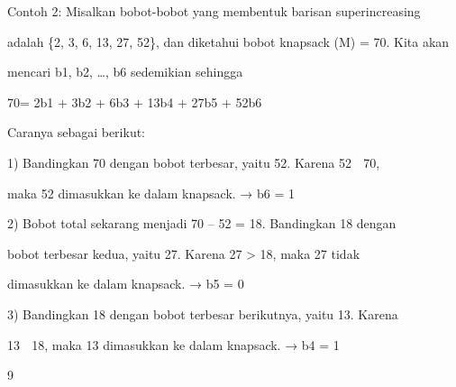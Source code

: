 \documentclass{article}
\begin{document}

Contoh 2: Misalkan bobot-bobot yang membentuk barisan superincreasing 

adalah \{2, 3, 6, 13, 27, 52\}, dan diketahui bobot knapsack (M) = 70. Kita akan 

mencari b1, b2, …, b6 sedemikian sehingga


70= 2b1 + 3b2 + 6b3 + 13b4 + 27b5 + 52b6

 Caranya sebagai berikut:

1) Bandingkan 70 dengan bobot terbesar, yaitu 52. Karena 52  70, 

maka 52 dimasukkan ke dalam knapsack.  → b6 = 1

2) Bobot total sekarang menjadi 70 – 52 = 18. Bandingkan 18 dengan 

bobot terbesar kedua, yaitu 27. Karena 27 > 18, maka 27 tidak 

dimasukkan ke dalam knapsack. → b5 = 0

3) Bandingkan 18 dengan bobot terbesar berikutnya, yaitu 13. Karena 

13  18, maka 13 dimasukkan ke dalam knapsack. → b4 = 1

9
\end{document}
